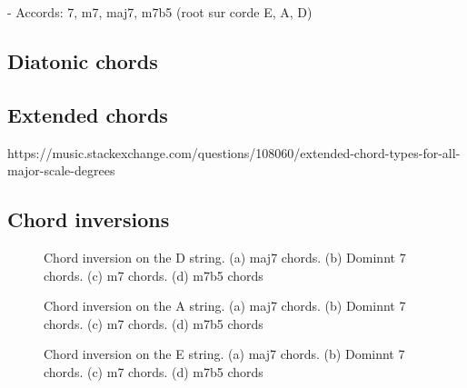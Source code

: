 \documentclass{article}
\begin{document}


- Accords: 7, m7, maj7, m7b5 (root sur corde E, A, D)


\clearpage
\subsection{Diatonic chords}




\subsection{Extended chords}

https://music.stackexchange.com/questions/108060/extended-chord-types-for-all-major-scale-degrees

\clearpage
\subsection{Chord inversions}

\begin{figure}[h!]
	\centering
	\hspace*{-2.2cm}
	\scalebox{0.7}{}
	\hspace*{-2.2cm}
	\scalebox{0.7}{}
	\hspace*{-2.2cm}
	\scalebox{0.7}{}
	\hspace*{-2.2cm}
	\scalebox{0.7}{}
	\caption{Chord inversion on the D string. (a) maj7 chords. (b) Dominnt 7 chords. (c) m7 chords. (d) m7b5 chords }
	\label{fig}
\end{figure}

\begin{figure}[h!]
	\centering
	\caption{Chord inversion on the A string. (a) maj7 chords. (b) Dominnt 7 chords. (c) m7 chords. (d) m7b5 chords }
	\label{fig}
\end{figure}

\begin{figure}[h!]
	\centering
	\caption{Chord inversion on the E string. (a) maj7 chords. (b) Dominnt 7 chords. (c) m7 chords. (d) m7b5 chords }
	\label{fig}
\end{figure}
\end{document}
